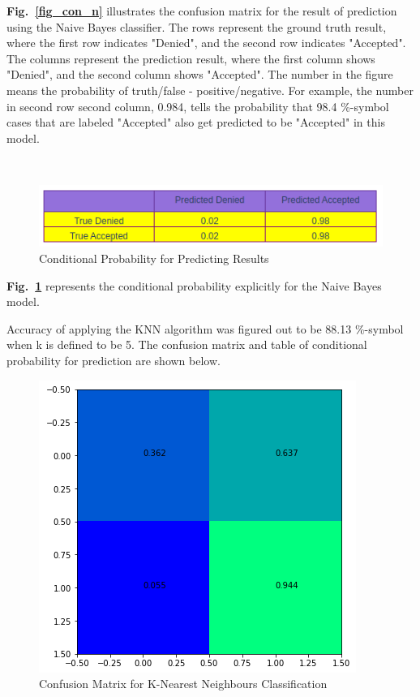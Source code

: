 \documentclass[conference]{IEEEtran}
\begin{document}
\textbf{Fig.~\ref{fig_con_n}} illustrates the confusion matrix for the result of prediction using the Naive Bayes classifier. The rows represent the ground truth result, where the first row indicates "Denied", and the second row indicates "Accepted". The columns represent the prediction result, where the first column shows "Denied", and the second column shows "Accepted". The number in the figure means the probability of truth/false - positive/negative. For example, the number in second row second column, 0.984, tells the probability that 98.4 \%-symbol cases that are labeled "Accepted" also get predicted to be "Accepted" in this model. 

\hfill\\

\begin{figure}[htbp]
\centerline{\hbox{\hspace{1em}\includegraphics[scale = 0.5]{naive_bayes.png}}}
\caption{Conditional Probability for Predicting Results}
\label{fig_tab_n}
\end{figure}

\textbf{Fig.~\ref{fig_tab_n}} represents the conditional probability explicitly for the Naive Bayes model. 

Accuracy of applying the KNN algorithm was figured out to be 88.13 \%-symbol when k is defined to be 5. The confusion matrix and table of conditional probability for prediction are shown below. 

\begin{figure}[htbp]
\centerline{\hbox{\hspace{1em}\includegraphics[scale = 0.5]{confus_knn.png}}}
\caption{Confusion Matrix for K-Nearest Neighbours Classification}
\label{fig_con_k}
\end{figure}
\end{document}
